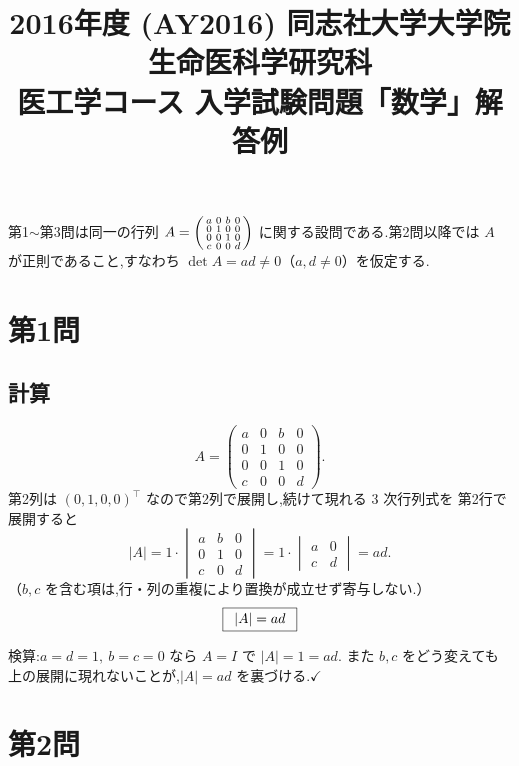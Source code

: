 \documentclass[11pt,a4paper]{article}
\title{2016年度 (AY2016) 同志社大学大学院 生命医科学研究科\\
医工学コース 入学試験問題「数学」解答例}
\author{}
\date{}
\begin{document}
\maketitle
\vspace{-3em}

\begin{rem}
第1$\sim$第3問は同一の行列
$A=\begin{psmallmatrix}a&0&b&0\\0&1&0&0\\0&0&1&0\\c&0&0&d\end{psmallmatrix}$
に関する設問である.第2問以降では $A$ が正則であること,すなわち
$\det A=ad\neq0$（$a,d\neq0$）を仮定する.
\end{rem}

\section*{第1問}

\subsection*{計算}

\[
A=\begin{pmatrix}a&0&b&0\\0&1&0&0\\0&0&1&0\\c&0&0&d\end{pmatrix}.
\]
第2列は $(0,1,0,0)^\top$ なので第2列で展開し,続けて現れる $3$ 次行列式を
第2行で展開すると
\[
|A|=1\cdot\begin{vmatrix}a&b&0\\0&1&0\\c&0&d\end{vmatrix}
=1\cdot\begin{vmatrix}a&0\\c&d\end{vmatrix}=ad.
\]
（$b,c$ を含む項は,行・列の重複により置換が成立せず寄与しない.）
\[
\boxed{\,\ |A|=ad\ \,}
\]

検算:$a=d=1,\ b=c=0$ なら $A=I$ で $|A|=1=ad$.
また $b,c$ をどう変えても上の展開に現れないことが,$|A|=ad$ を裏づける.$\checkmark$

\section*{第2問}
\end{document}
